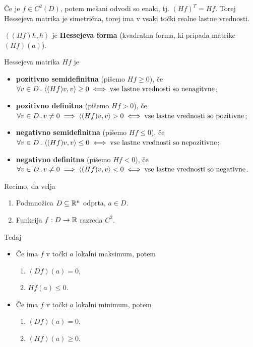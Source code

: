 \begin{opomba}
    Če je $f \in C^2(D)$, potem mešani odvodi so enaki, tj. $(Hf)^T = Hf$. Torej Hessejeva matrika je simetrična, torej ima v vsaki točki realne lastne vrednosti. 
\end{opomba}

$\left\langle (Hf)h, h\right\rangle$ je \textbf{Hessejeva forma} (kvadratna forma, ki pripada matrike $(Hf)(a)$).

\begin{definicija}
    Hessejeva matrika $Hf$ je
    \begin{itemize}
        \item \textbf{pozitivno semidefinitna} (pišemo $Hf \geq 0$), če $\forall v \in D \,.\, \left\langle (Hf)v, v\right\rangle \geq 0 \iff \text{vse lastne vrednosti so nenagitvne}$;
        \item \textbf{pozitivno definitna} (pišemo $Hf > 0$), če $\forall v \in D \,.\, v \neq 0 \implies \left\langle (Hf)v, v\right\rangle > 0 \iff \text{vse lastne vrednosti so pozitivne}$;
        \item \textbf{negativno semidefinitna} (pišemo $Hf \leq 0$), če $\forall v \in D \,.\,\left\langle (Hf)v, v\right\rangle \leq 0 \iff \text{vse lastne vrednosti so nepozitivne}$;
        \item \textbf{negativno definitna} (pišemo $Hf < 0$), če $\forall v \in D \,.\, v \neq 0 \implies \left\langle (Hf)v, v\right\rangle < 0 \iff \text{vse lastne vrednosti so negativne}$.
    \end{itemize}
\end{definicija}

\begin{trditev}
    Recimo, da velja
    \begin{enumerate}
        \item Podmnožica $D \subseteq \mathbb{R}^n$ odprta, $a \in D$.
        \item Funkcija $f: D \to \mathbb{R}$ razreda $C^2$.
    \end{enumerate}
    Tedaj
    \begin{itemize}
        \item Če ima $f$ v točki $a$ lokalni maksimum, potem
        \begin{enumerate}
            \item $(Df)(a) = 0$,
            \item $Hf(a) \leq 0$.
        \end{enumerate}
        \item Če ima $f$ v točki $a$ lokalni minimum, potem
        \begin{enumerate}
            \item $(Df)(a) = 0$,
            \item $(Hf)(a) \geq 0$.
        \end{enumerate}
    \end{itemize}
\end{trditev}

